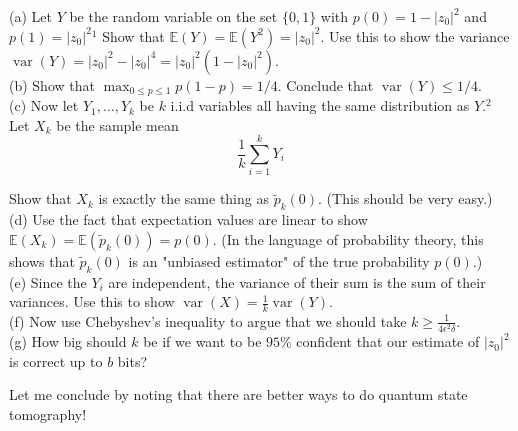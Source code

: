 \begin{problem}
(a) Let $Y$ be the random variable on the set $\{0,1\}$ with $p(0)=1-\left|z_0\right|^2$ and $p(1)=\left|z_0\right|^2{ }^1$ Show that $\mathbb{E}(Y)=\mathbb{E}\left(Y^2\right)=\left|z_0\right|^2$. Use this to show the variance $\operatorname{var}(Y)=\left|z_0\right|^2-\left|z_0\right|^4=\left|z_0\right|^2\left(1-\left|z_0\right|^2\right)$.\\
(b) Show that $\max _{0 \leq p \leq 1} p(1-p)=1 / 4$. Conclude that $\operatorname{var}(Y) \leq 1 / 4$.\\
(c) Now let $Y_1, \ldots, Y_k$ be $k$ i.i.d variables all having the same distribution as $Y .{ }^2$ Let $X_k$ be the sample mean
\[
\frac{1}{k} \sum_{i=1}^k Y_i
\]

Show that $X_k$ is exactly the same thing as $\tilde{p}_k(0)$. (This should be very easy.)\\
(d) Use the fact that expectation values are linear to show $\mathbb{E}\left(X_k\right)=\mathbb{E}\left(\tilde{p}_k(0)\right)=p(0)$. (In the language of probability theory, this shows that $\tilde{p}_k(0)$ is an "unbiased estimator" of the true probability $p(0)$.)\\
(e) Since the $Y_i$ are independent, the variance of their sum is the sum of their variances. Use this to show $\operatorname{var}(X)=\frac{1}{k} \operatorname{var}(Y)$.\\
(f) Now use Chebyshev's inequality to argue that we should take $k \geq \frac{1}{4 \epsilon^2 \delta}$.\\
(g) How big should $k$ be if we want to be $95 \%$ confident that our estimate of $\left|z_0\right|^2$ is correct up to $b$ bits?

Let me conclude by noting that there are better ways to do quantum state tomography!
\end{problem}
